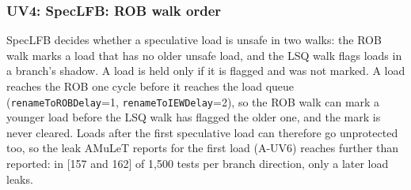 \subsubsection{UV4: SpecLFB: ROB walk order} SpecLFB decides whether a speculative load is unsafe in two walks: the ROB walk marks a load that has no older unsafe load, and the LSQ walk flags loads in a branch's shadow. A load is held only if it is flagged and was not marked. A load reaches the ROB one cycle before it reaches the load queue (\texttt{renameToROBDelay}=1, \texttt{renameToIEWDelay}=2), so the ROB walk can mark a younger load before the LSQ walk has flagged the older one, and the mark is never cleared. Loads after the first speculative load can therefore go unprotected too, so the leak AMuLeT reports for the first load (A-UV6) reaches further than reported: in [157 and 162] of 1{,}500 tests per branch direction, only a later load leaks.
\urgentbr{}
